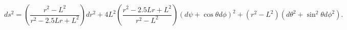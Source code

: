 \begin{equation}
ds^2=\left(\frac{r^{2} - L^{2}}{r^{2}-2.5Lr + L^2}\right)dr^{2}+4
L^{2} \left(\frac{r^{2}-2.5Lr + L^2}{r^{2} - L^{2}}\right) (d\psi+\cos
\theta d\phi)^{2}+(r^{2}-L^{2})(d\theta^{2}+\sin^{2}\theta
d\phi^{2}).\label{Tbo}
\end{equation}

